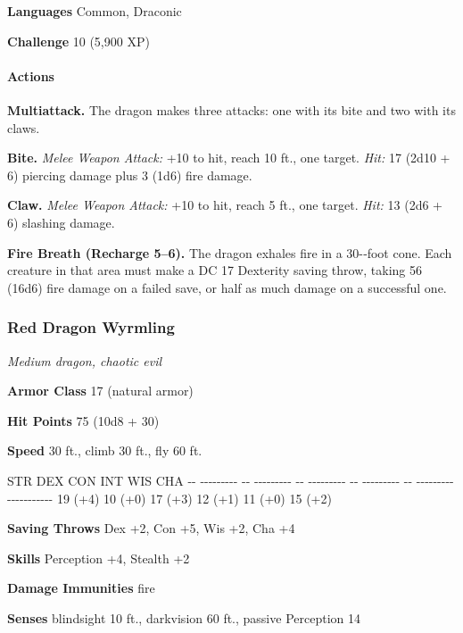 \documentclass[
]{article}
\begin{document}
\textbf{Languages} Common, Draconic

\textbf{Challenge} 10 (5,900 XP)

\hypertarget{actions-37}{%
\paragraph{Actions}\label{actions-37}}

\textbf{Multiattack.} The dragon makes three attacks: one with its bite
and two with its claws.

\textbf{Bite.} \emph{Melee Weapon Attack:} +10 to hit, reach 10 ft., one
target. \emph{Hit:} 17 (2d10 + 6) piercing damage plus 3 (1d6) fire
damage.

\textbf{Claw.} \emph{Melee Weapon Attack:} +10 to hit, reach 5 ft., one
target. \emph{Hit:} 13 (2d6 + 6) slashing damage.

\textbf{Fire Breath (Recharge 5--6).} The dragon exhales fire in a
30-­‐foot cone. Each creature in that area must make a DC 17 Dexterity
saving throw, taking 56 (16d6) fire damage on a failed save, or half as
much damage on a successful one.

\hypertarget{red-dragon-wyrmling}{%
\subsubsection{Red Dragon Wyrmling}\label{red-dragon-wyrmling}}

\emph{Medium dragon, chaotic evil}

\textbf{Armor Class} 17 (natural armor)

\textbf{Hit Points} 75 (10d8 + 30)

\textbf{Speed} 30 ft., climb 30 ft., fly 60 ft.

\textbar{} STR \textbar{} DEX \textbar{} CON \textbar{} INT \textbar{}
WIS \textbar{} CHA \textbar{} \textbar{} -\/- -\/-\/-\/-\/-\/-\/-\/-\/-
\textbar{} -\/- -\/-\/-\/-\/-\/-\/-\/-\/- \textbar{} -\/-
-\/-\/-\/-\/-\/-\/-\/-\/- \textbar{} -\/- -\/-\/-\/-\/-\/-\/-\/-\/-
\textbar{} -\/- -\/-\/-\/-\/-\/-\/-\/-\/- \textbar{}
-\/-\/-\/-\/-\/-\/-\/-\/-\/-\/- \textbar{} \textbar{} 19 (+4) \textbar{}
10 (+0) \textbar{} 17 (+3) \textbar{} 12 (+1) \textbar{} 11 (+0)
\textbar{} 15 (+2) \textbar{}

\textbf{Saving Throws} Dex +2, Con +5, Wis +2, Cha +4

\textbf{Skills} Perception +4, Stealth +2

\textbf{Damage Immunities} fire

\textbf{Senses} blindsight 10 ft., darkvision 60 ft., passive Perception
14
\end{document}
